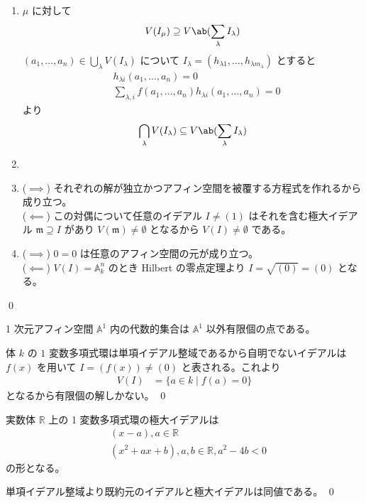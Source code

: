 \documentclass[uplatex,dvipdfmx,a4paper,11pt]{jlreq}
\makeatletter
\newcommand{\RR}{\mathbb{R}}
\renewcommand{\AA}{\mathbb{A}}
\newcommand{\mm}{\mathfrak{m}}
\numberwithin{equation}{section}
\theoremstyle{definition}
\renewenvironment{proof}[1][\proofname]{\par
  \normalfont
  \topsep6\p@\@plus6\p@ \trivlist
  \item[\hskip\labelsep{\bfseries #1}\@addpunct{\bfseries}]\ignorespaces\quad\par
}{%
  \qed\endtrivlist\@endpefalse
}
\renewcommand\proofname{証明}
\makeatother
\begin{document}
\begin{proof}
\begin{enumerate}
    \item $\mu$ に対して
          \begin{align}
            V(I_\mu) \supseteq V\ab(\sum_\lambda I_\lambda)
          \end{align}
          $(a_1,\ldots,a_n)\in\bigcup_\lambda V(I_\lambda)$ について $I_\lambda = (h_{\lambda 1},\ldots,h_{\lambda m_\lambda})$ とすると
          \begin{align}
             & h_{\lambda i}(a_1,\ldots,a_n) = 0                                    \\
             & \sum_{\lambda, i} f(a_1,\ldots,a_n)h_{\lambda i}(a_1,\ldots,a_n) = 0
          \end{align}
          より
          \begin{align}
            \bigcap_\lambda V(I_\lambda) \subseteq V\ab(\sum_\lambda I_\lambda)
          \end{align}
    \item
    \item ($\implies$) それぞれの解が独立かつアフィン空間を被覆する方程式を作れるから成り立つ。 \\
          ($\impliedby$) この対偶について任意のイデアル $I \neq (1)$ はそれを含む極大イデアル $\mm\supseteq I$ があり $V(\mm) \neq \emptyset$ となるから $V(I) \neq \emptyset$ である。
    \item ($\implies$) $0 = 0$ は任意のアフィン空間の元が成り立つ。 \\
          ($\impliedby$) $V(I) = \AA_k^n$ のとき Hilbert の零点定理より $I = \sqrt{(0)} = (0)$ となる。
  \end{enumerate}
\end{proof}

\begin{proposition}
  1 次元アフィン空間 $\AA^1$ 内の代数的集合は $\AA^1$ 以外有限個の点である。
\end{proposition}
\begin{proof}
  体 $k$ の $1$ 変数多項式環は単項イデアル整域であるから自明でないイデアルは $f(x)$ を用いて $I = (f(x)) \neq (0)$ と表される。これより
  \begin{align}
    V(I) & = \lbrace a\in k\mid f(a) = 0\rbrace
  \end{align}
  となるから有限個の解しかない。
\end{proof}

\begin{proposition}
  実数体 $\RR$ 上の 1 変数多項式環の極大イデアルは
  \begin{align}
     & (x - a), a\in\RR                        \\
     & (x^2 + ax + b), a,b\in\RR, a^2 - 4b < 0
  \end{align}
  の形となる。
\end{proposition}
\begin{proof}
  単項イデアル整域より既約元のイデアルと極大イデアルは同値である。
\end{proof}
\end{document}
